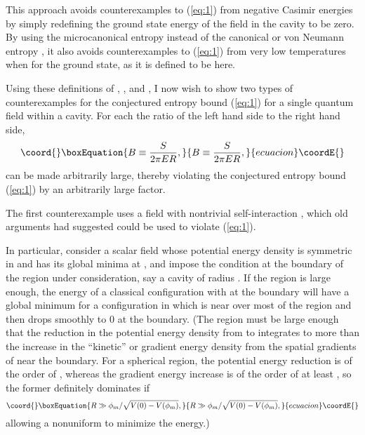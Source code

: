\documentclass[a4paper,12pt]{article}
\begin{document}
	This approach avoids counterexamples to (\ref{eq:1})
\cite{Unw,Page1,AW}
from negative Casimir energies by simply redefining
the ground state energy of the field in the cavity
to be zero.  By using the microcanonical entropy
\coordHE{} instead of the canonical or von Neumann
entropy \coordHE{}, it also avoids
counterexamples to (\ref{eq:1})
\cite{Deu,FMW,Page2}
from very low temperatures when \coordHE{} for the ground state,
as it is defined to be here.

	Using these definitions of \coordHE{}, \coordHE{}, and \coordHE{},
I now wish to show two types of counterexamples
for the conjectured entropy bound (\ref{eq:1})
for a single quantum field within a cavity.
For each the ratio of the left hand side
to the right hand side,
 \begin{equation}\coord{}\boxEquation{
 B \equiv {S \over 2 \pi E R},
 \label{eq:2}
 }{
 B \equiv {S \over 2 \pi E R},
 }{ecuacion}\coordE{}\end{equation}
can be made arbitrarily large,
thereby violating the conjectured entropy bound (\ref{eq:1})
by an arbitrarily large factor.

	The first counterexample uses a field with nontrivial
self-interaction
\cite{Page2},
which old arguments
\cite{Page1}
had suggested could be used to violate (\ref{eq:1}).

	In particular, consider a scalar field
\myHighlight{$\phi$}\coordHE{} whose potential energy density \coordHE{}
is symmetric in \myHighlight{$\phi$}\coordHE{} and has its global
minima at \coordHE{},
and impose the condition \coordHE{} at the boundary
of the region under consideration,
say a cavity of radius \coordHE{}.
If the region is large enough,
the energy of a classical configuration
with \coordHE{} at the boundary will have
a global minimum for a configuration
in which \myHighlight{$\phi$}\coordHE{} is near \coordHE{} over most
of the region and then drops smoothly to 0
at the boundary.
(The region must be large enough that
the reduction in the potential energy density
from \coordHE{} to \coordHE{} integrates to more
than the increase in the ``kinetic''
or gradient energy density from the spatial
gradients of \myHighlight{$\phi$}\coordHE{} near the boundary.
For a spherical region, the potential energy
reduction is of the order of \coordHE{},
whereas the gradient energy increase is of the order
of at least \coordHE{},
so the former definitely dominates if
 \begin{equation}\coord{}\boxEquation{
 R \gg \phi_m/\sqrt{V(0)-V(\phi_m)},
 \label{eq:4}
 }{
 R \gg \phi_m/\sqrt{V(0)-V(\phi_m)},
 }{ecuacion}\coordE{}\end{equation}
allowing a nonuniform \coordHE{} to minimize the energy.)
\end{document}

